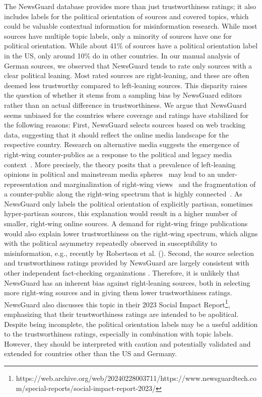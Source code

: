 \documentclass[12pt,twoside]{article}
\begin{document}
The NewsGuard database provides more than just trustworthiness ratings; it also includes labels for the political orientation of sources and covered topics, which could be valuable contextual information for misinformation research.
While most sources have multiple topic labels, only a minority of sources have one for political orientation. 
While about 41\% of sources have a political orientation label in the US, only around 10\% do in other countries.
In our manual analysis of German sources, we observed that NewsGuard tends to rate only sources with a clear political leaning. 
Most rated sources are right-leaning, and these are often deemed less trustworthy compared to left-leaning sources. 
This disparity raises the question of whether it stems from a sampling bias by NewsGuard editors rather than an actual difference in trustworthiness.
We argue that NewsGuard seems unbiased for the countries where coverage and ratings have stabilized for the following reasons:
First, NewsGuard selects sources based on web tracking data, suggesting that it should reflect the online media landscape for the respective country. 
Research on alternative media suggests the emergence of right-wing counter-publics as a response to the political and legacy media context~\citep{heftBreitbartComparingRightWing2020}. 
More precisely, the theory posits that a prevalence of left-leaning opinions in political and mainstream media spheres~\citep{osmundsenPartisanPolarizationPrimary2021a} may lead to an under-representation and marginalization of right-wing views~\citep{benklerNetworkPropagandaManipulation2018a} and the fragmentation of a counter-public along the right-wing spectrum that is highly connected~\citep{heftTransnationalInformationEcology2021}.
As NewsGuard only labels the political orientation of explicitly partisan, sometimes hyper-partisan sources, this explanation would result in a higher number of smaller, right-wing online sources.
A demand for right-wing fringe publications would also explain lower trustworthiness on the right-wing spectrum, which aligns with the political asymmetry repeatedly observed in susceptibility to misinformation, e.g., recently by Robertson et al. (\citeyear{robertsonUsersChooseEngage2023a}). 
Second, the source selection and trustworthiness ratings provided by NewsGuard are largely consistent with other independent fact-checking organizations \citep{linHighLevelCorrespondence2023a}. 
Therefore, it is unlikely that NewsGuard has an inherent bias against right-leaning sources, both in selecting more right-wing sources and in giving them lower trustworthiness ratings.
NewsGuard also discusses this topic in their 2023 Social Impact Report\footnote{https://web.archive.org/web/20240228003711/https://www.newsguardtech.com/special-reports/social-impact-report-2023/}, emphasizing that their trustworthiness ratings are intended to be apolitical. 
Despite being incomplete, the political orientation labels may be a useful addition to the trustworthiness ratings, especially in combination with topic labels.
However, they should be interpreted with caution and potentially validated and extended for countries other than the US and Germany.
\end{document}

